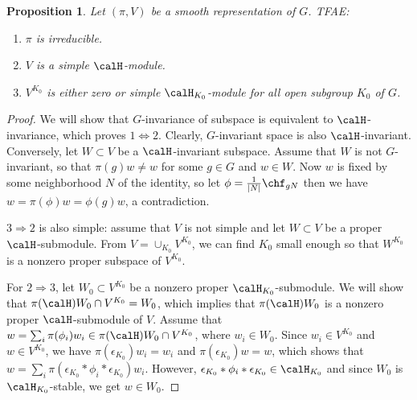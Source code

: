 \documentclass{article}
\newtheorem{proposition}{Proposition}[section]
\begin{document}
\begin{proposition}
\label{simple}
Let $(\pi, V)$ be a smooth representation of $G$. TFAE:
\begin{enumerate}
\item $\pi$ is irreducible. 
\item $V$ is a simple $\calH$-module. 
\item $V^{K_{0}}$ is either zero or simple $\calH_{K_{0}}$-module for all open subgroup $K_{0}$ of $G$. 
\end{enumerate}
\end{proposition}
\begin{proof}
We will show that $G$-invariance of subspace is equivalent to $\calH$-invariance, which proves $1\Leftrightarrow 2$. Clearly,  $G$-invariant space is also $\calH$-invariant. Conversely, let $W\subset V$ be a $\calH$-invariant subspace. Assume that $W$ is not $G$-invariant, so that $\pi(g)w\neq w$ for some $g\in G$ and $w\in W$. 
Now $w$ is fixed by some neighborhood $N$ of the identity, so let $\phi = \frac{1}{|N|} \chf_{gN}$ then we have $w = \pi(\phi)w = \phi(g)w$, a contradiction. 

$3\Rightarrow 2$ is also simple: assume that $V$ is not simple and let $W \subset V$ be a proper $\calH$-submodule. From $V = \cup_{K_{0}} V^{K_{0}}$, we can find $K_{0}$ small enough so that $W^{K_{0}}$ is a nonzero proper subspace of $V^{K_{0}}$.

For $2\Rightarrow3$, let $W_{0}\subset V^{K_{0}}$ be a nonzero proper $\calH_{K_{0}}$-submodule. We will show that $\pi(\calH)W_{0} \cap V^{K_{0}} = W_{0}$, which implies that $\pi(\calH)W_{0}$ is a nonzero proper $\calH$-submodule of $V$. 
Assume that $w = \sum_{i} \pi(\phi_{i})w_{i} \in \pi(\calH)W_{0}\cap V^{K_{0}}$, where $w_{i}\in W_{0}$. 
Since $w_{i}\in V^{K_{0}}$ and $w\in V^{K_{0}}$, we have $\pi(\epsilon_{K_{0}})w_{i} = w_{i}$ and $\pi(\epsilon_{K_{0}})w = w$, which shows that $w = \sum_{i} \pi(\epsilon_{K_{0}} * \phi_{i} * \epsilon_{K_{0}}) w_{i}$. 
However, $\epsilon_{K_{0}} * \phi_{i} * \epsilon_{K_{0}} \in \calH_{K_{0}}$ and since $W_{0}$ is $\calH_{K_{0}}$-stable, we get $w\in W_{0}$. 
\end{proof}
\end{document}
